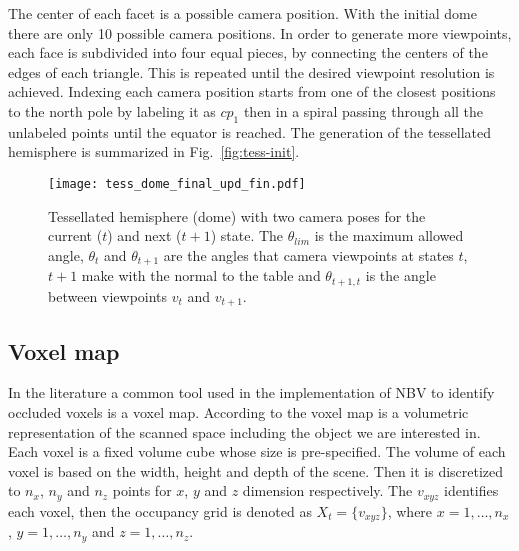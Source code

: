 \documentclass[10pt,twocolumn,letterpaper]{article}
\begin{document}
The center of each facet is a possible camera position. 
With the initial dome there are only 10 possible camera positions. 
In order to generate more viewpoints, each face is subdivided into four equal pieces, by connecting the centers of the edges of each triangle. 
This is repeated until the desired viewpoint resolution is achieved. 
Indexing each camera position starts from one of the closest positions to the north pole by labeling it as $cp_{1}$ then in a spiral passing through all the unlabeled points until the equator is reached. 
The generation of the tessellated hemisphere is summarized in Fig.~\ref{fig:tess-init}.

\begin{figure}[b]
  \texttt{[image: tess\_dome\_final\_upd\_fin.pdf]}
  \centering
  \caption{Tessellated hemisphere (dome) with two camera poses for the current ($t$) and next ($t+1$) state. 
  The $\theta_{lim}$ is the maximum allowed angle, $\theta_{t}$ and $\theta_{t+1}$ are the angles that camera viewpoints at states $t$, $t+1$ make with the normal to the table and $\theta_{t+1,t}$ is the angle between viewpoints $v_{t}$ and $v_{t+1}$.}
  \label{fig:dome}
\end{figure}

\subsection{Voxel map}\label{sec:occmap}
In the literature a common tool used in the implementation of NBV to identify occluded voxels is a voxel map. 
According to \cite{Massios1998} the voxel map is a volumetric representation of the scanned space including the object we are interested in. 
Each voxel is a fixed volume cube whose size is pre-specified. 
The volume of each voxel is based on the width, height and depth of the scene. 
Then it is discretized to $n_{x}$, $n_{y}$ and $n_{z}$ points for $x$, $y$ and $z$ dimension respectively. 
The $v_{xyz}$ identifies each voxel, then the occupancy grid is denoted as 
$X_{t}=\{v_{xyz}\}$, where $x=1,\ldots, n_{x}$, $y=1,\ldots, n_{y}$ and $z=1,\ldots, n_{z}$.
\end{document}
